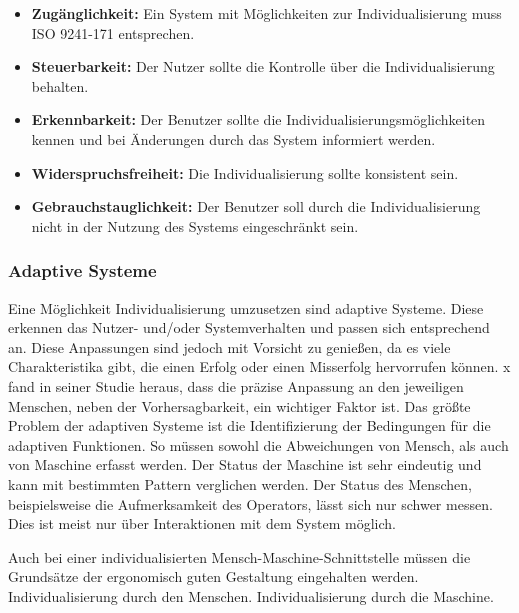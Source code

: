 \begin{itemize}
\item \textbf{Zugänglichkeit:} Ein System mit Möglichkeiten zur Individualisierung muss ISO 9241-171 entsprechen.
\item \textbf{Steuerbarkeit:} Der Nutzer sollte die Kontrolle über die Individualisierung behalten.
\item \textbf{Erkennbarkeit:} Der Benutzer sollte die Individualisierungsmöglichkeiten kennen und bei Änderungen durch das System informiert werden.
\item \textbf{Widerspruchsfreiheit:} Die Individualisierung sollte konsistent sein.
\item \textbf{Gebrauchstauglichkeit:} Der Benutzer soll durch die Individualisierung nicht in der Nutzung des Systems eingeschränkt sein.
\end{itemize}

\subsubsection*{Adaptive Systeme}
Eine Möglichkeit Individualisierung umzusetzen sind adaptive Systeme. Diese erkennen das Nutzer- und/oder Systemverhalten und passen sich entsprechend an. Diese Anpassungen sind jedoch mit Vorsicht zu genießen, da es viele Charakteristika gibt, die einen Erfolg oder einen Misserfolg hervorrufen können. x fand in seiner Studie heraus, dass die präzise Anpassung an den jeweiligen Menschen, neben der Vorhersagbarkeit, ein wichtiger Faktor ist. Das größte Problem der adaptiven Systeme ist die Identifizierung der Bedingungen für die adaptiven Funktionen. So müssen sowohl die Abweichungen von Mensch, als auch von Maschine erfasst werden. Der Status der Maschine ist sehr eindeutig und kann mit bestimmten Pattern verglichen werden. Der Status des Menschen, beispielsweise die Aufmerksamkeit des Operators, lässt sich nur schwer messen. Dies ist meist nur über Interaktionen mit dem System möglich.



Auch bei einer individualisierten Mensch-Maschine-Schnittstelle müssen die Grundsätze der ergonomisch guten Gestaltung eingehalten werden. 
Individualisierung durch den Menschen. Individualisierung durch die Maschine.


